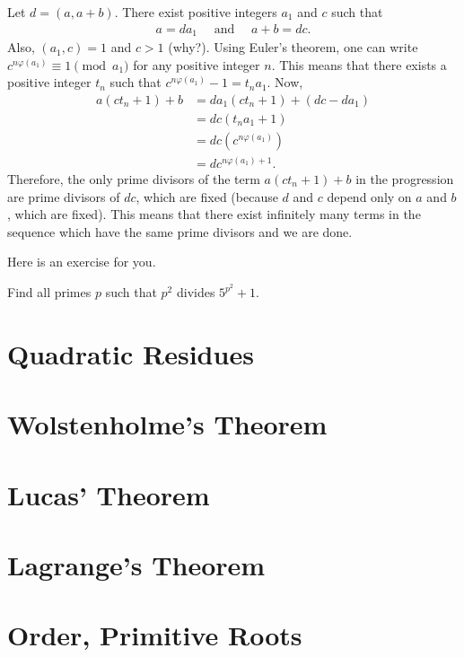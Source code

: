\documentclass{subfile}
\begin{document}
		\begin{solution}
			Let $d=(a, a+b)$. There exist positive integers $a_1$ and $c$ such that
				\begin{align*}
					a=da_1 \quad \text{ and } \quad a+b=dc.
				\end{align*}
			Also, $(a_1,c)=1$ and $c >1$ (why?). Using Euler's theorem, one can write $c^{n\varphi(a_1)} \equiv 1 \pmod {a_1}$ for any positive integer $n$. This means that there exists a positive integer $t_n$ such that $c^{n\varphi(a_1)}-1 = t_na_1$. Now,
				\begin{align*}
					a(ct_n+1) + b &= da_1(ct_n+1) + (dc-da_1)\\
								  &= dc(t_na_1 + 1)\\
								  &= dc \left(c^{n\varphi(a_1)}\right)\\
								  &= dc^{n\varphi(a_1)+1}.
				\end{align*}
			Therefore, the only prime divisors of the term $a(ct_n+1) + b$ in the progression are prime divisors of $dc$, which are fixed (because $d$ and $c$ depend only on $a$ and $b$, which are fixed). This means that there exist infinitely many terms in the sequence which have the same prime divisors and we are done.
		\end{solution}
	Here is an exercise for you.
		\begin{problem}
			Find all primes $p$ such that $p^2$ divides $5^{p^2}+1$.
		\end{problem}
		
	
	\section{Quadratic Residues}\label{sec:qr}
		
	\section{Wolstenholme's Theorem}
		
	\section{Lucas' Theorem}
			
	\section{Lagrange's Theorem}
		
	\section{Order, Primitive Roots} \label{sec:order}
		
\end{document}
